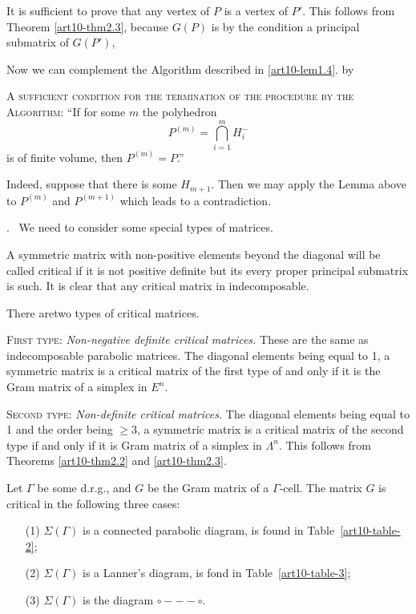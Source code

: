 It is sufficient to prove that any vertex of $P$ is a vertex of $P'$. This follows from Theorem \ref{art10-thm2.3}, because $G(P)$ is by the condition a principal submatrix of $G(P')$,

Now we can complement the Algorithm described in \ref{art10-lem1.4}. by 

\textsc{A sufficient condition for the termination of the procedure by the Algorithm:} ``If for some $m$ the polyhedron
$$
P^{(m)} = \bigcap\limits^m_{i=1} H^-_i
$$
is of finite volume, then $P^{(m)} = P$.''

Indeed, suppose that there is some $H_{m+1}$. Then we may apply the Lemma above to $P^{(m)}$ and $P^{(m+1)}$ which leads to a contradiction. 

.~  We need to consider some special types of matrices. 

A symmetric matrix with non-positive elements beyond the diagonal will be called critical if it is not positive definite but its every proper principal submatrix is such. It is clear that any critical matrix in indecomposable.

There are\pageoriginale two types of critical matrices.

\medskip
\textsc{First type:} \textit{Non-negative definite critical matrices.} These are the same as indecomposable parabolic matrices. The diagonal elements being equal to 1, a symmetric matrix is a critical matrix of the first type of and only if it is the Gram matrix of a simplex in $E^n$.

\medskip
\textsc{Second type:} \textit{Non-definite critical matrices.} The diagonal elements being equal to 1 and the order being $\geqslant 3$, a symmetric matrix is a critical matrix of the second type if and only if it is Gram matrix of a simplex in $\Lambda^n$. This follows from Theorems \ref{art10-thm2.2} and \ref{art10-thm2.3}. 

Let $\Gamma$ be some d.r.g., and $G$ be the Gram matrix of a $\Gamma$-cell. The matrix $G$ is critical in the following three cases:
\begin{itemize}
\item[(1)] $\Sigma (\Gamma)$ is a connected parabolic diagram, \ie is found in Table~\ref{art10-table-2};

\item[(2)] $\Sigma (\Gamma)$ is a Lanner's diagram, \ie is fond in Table~\ref{art10-table-3};

\item[(3)] $\Sigma (\Gamma)$ is the diagram $\circ - - - \circ$.
\end{itemize}

